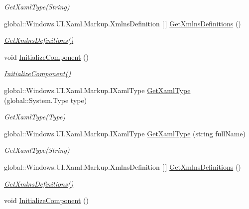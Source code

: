 \begin{DoxyCompactItemize}
\begin{DoxyCompactList}\small\item\em Get\+Xaml\+Type(\+String) \end{DoxyCompactList}\item 
global\+::\+Windows.\+U\+I.\+Xaml.\+Markup.\+Xmlns\+Definition \mbox{[}$\,$\mbox{]} \hyperlink{class_i_v_s_calc_1_1_app_a8f8ce062718726306de29d798b53bdba}{Get\+Xmlns\+Definitions} ()
\begin{DoxyCompactList}\small\item\em \hyperlink{class_i_v_s_calc_1_1_app_a8f8ce062718726306de29d798b53bdba}{Get\+Xmlns\+Definitions()} \end{DoxyCompactList}\item 
void \hyperlink{class_i_v_s_calc_1_1_app_a52893841ad75312381695e5fae721452}{Initialize\+Component} ()
\begin{DoxyCompactList}\small\item\em \hyperlink{class_i_v_s_calc_1_1_app_a52893841ad75312381695e5fae721452}{Initialize\+Component()} \end{DoxyCompactList}\item 
global\+::\+Windows.\+U\+I.\+Xaml.\+Markup.\+I\+Xaml\+Type \hyperlink{class_i_v_s_calc_1_1_app_aef34fbc14d2a7b2c647dd5e7b8252cb8}{Get\+Xaml\+Type} (global\+::\+System.\+Type type)
\begin{DoxyCompactList}\small\item\em Get\+Xaml\+Type(\+Type) \end{DoxyCompactList}\item 
global\+::\+Windows.\+U\+I.\+Xaml.\+Markup.\+I\+Xaml\+Type \hyperlink{class_i_v_s_calc_1_1_app_a0ecb22e44dc1f88762844f47b18f2e7b}{Get\+Xaml\+Type} (string full\+Name)
\begin{DoxyCompactList}\small\item\em Get\+Xaml\+Type(\+String) \end{DoxyCompactList}\item 
global\+::\+Windows.\+U\+I.\+Xaml.\+Markup.\+Xmlns\+Definition \mbox{[}$\,$\mbox{]} \hyperlink{class_i_v_s_calc_1_1_app_a8f8ce062718726306de29d798b53bdba}{Get\+Xmlns\+Definitions} ()
\begin{DoxyCompactList}\small\item\em \hyperlink{class_i_v_s_calc_1_1_app_a8f8ce062718726306de29d798b53bdba}{Get\+Xmlns\+Definitions()} \end{DoxyCompactList}\item 
void \hyperlink{class_i_v_s_calc_1_1_app_a52893841ad75312381695e5fae721452}{Initialize\+Component} ()

\end{DoxyCompactItemize}
